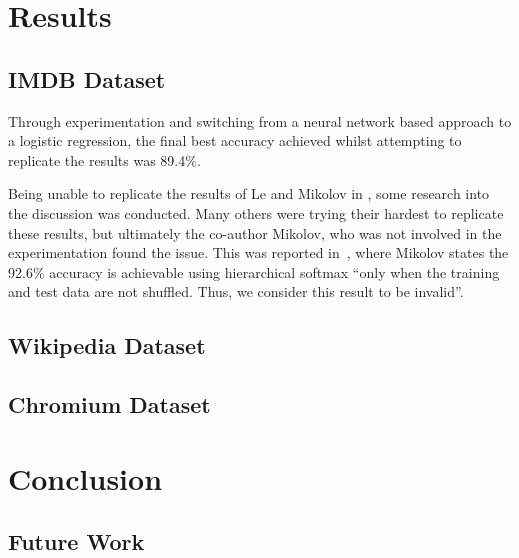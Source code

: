 \documentclass[11pt]{article}
\begin{document}
\section*{Results}

\subsection*{IMDB Dataset}


Through experimentation and switching from a neural network based approach to a logistic regression, the final best accuracy achieved whilst attempting to replicate the results was 89.4\%.

Being unable to replicate the results of Le and Mikolov in \cite{le2014distributed}, some research into the discussion was conducted. Many others were trying their hardest to replicate these results, but ultimately the co-author Mikolov, who was not involved in the experimentation found the issue. This was reported in~\cite{mesnil2014ensemble}, where Mikolov states the 92.6\% accuracy is achievable using hierarchical softmax ``only when the training and test data are not shuffled. Thus, we consider this result to be invalid''. 

\subsection*{Wikipedia Dataset}

\subsection*{Chromium Dataset}


\section*{Conclusion}


\subsection*{Future Work}

\printbibliography
\end{document}
